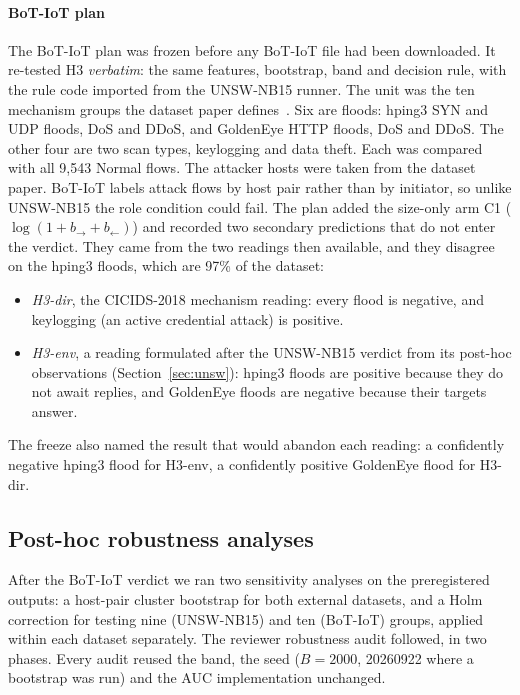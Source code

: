 \documentclass[preprint,12pt]{elsarticle}
\begin{document}
\paragraph{BoT-IoT plan} The BoT-IoT plan was frozen before any BoT-IoT file had been downloaded. It re-tested H3 \emph{verbatim}: the same features, bootstrap, band and decision rule, with the rule code imported from the UNSW-NB15 runner. The unit was the ten mechanism groups the dataset paper defines~\cite{koroniotis2019botiot}. Six are floods: hping3 SYN and UDP floods, DoS and DDoS, and GoldenEye HTTP floods, DoS and DDoS. The other four are two scan types, keylogging and data theft. Each was compared with all 9{,}543 Normal flows. The attacker hosts were taken from the dataset paper. BoT-IoT labels attack flows by host pair rather than by initiator, so unlike UNSW-NB15 the role condition could fail. The plan added the size-only arm C1 ($\log(1+b_{\rightarrow}+b_{\leftarrow})$) and recorded two secondary predictions that do not enter the verdict. They came from the two readings then available, and they disagree on the hping3 floods, which are 97\% of the dataset:
\begin{itemize}
\item \emph{H3-dir}, the CICIDS-2018 mechanism reading: every flood is negative, and keylogging (an active credential attack) is positive.
\item \emph{H3-env}, a reading formulated after the UNSW-NB15 verdict from its post-hoc observations (Section~\ref{sec:unsw}): hping3 floods are positive because they do not await replies, and GoldenEye floods are negative because their targets answer.
\end{itemize}
The freeze also named the result that would abandon each reading: a confidently negative hping3 flood for H3-env, a confidently positive GoldenEye flood for H3-dir.

\subsection{Post-hoc robustness analyses}\label{sec:posthoc-methods}

After the BoT-IoT verdict we ran two sensitivity analyses on the preregistered outputs: a host-pair cluster bootstrap for both external datasets, and a Holm correction for testing nine (UNSW-NB15) and ten (BoT-IoT) groups, applied within each dataset separately. The reviewer robustness audit followed, in two phases. Every audit reused the band, the seed ($B=2000$, 20260922 where a bootstrap was run) and the AUC implementation unchanged.
\end{document}
